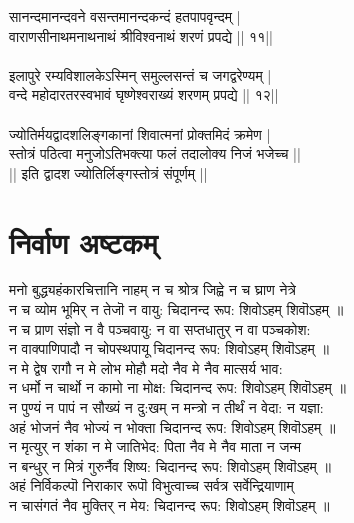 सानन्दमानन्दवने वसन्तमानन्दकन्दं हतपापवृन्दम् |\\
वाराणसीनाथमनाथनाथं श्रीविश्वनाथं शरणं प्रपद्ये || ११||\\
\\
इलापुरे रम्यविशालकेऽस्मिन् समुल्लसन्तं च जगद्वरेण्यम् |\\
वन्दे महोदारतरस्वभावं घृष्णेश्वराख्यं शरणम् प्रपद्ये || १२||\\
\\
ज्योतिर्मयद्वादशलिङ्गकानां शिवात्मनां प्रोक्तमिदं क्रमेण |\\
स्तोत्रं पठित्वा मनुजोऽतिभक्त्या फलं तदालोक्य निजं भजेच्च ||\\
|| इति द्वादश ज्योतिर्लिङ्गस्तोत्रं संपूर्णम् ||\\

\section{\sanskrit निर्वाण अष्टकम् }
\chandas
मनो बुद्ध्यहंकारचित्तानि नाहम् न च श्रोत्र जिह्वे न च घ्राण नेत्रे \\
न च व्योम भूमिर् न तेजॊ न वायु: चिदानन्द रूप: शिवोऽहम् शिवॊऽहम् ॥\\ 
न च प्राण संज्ञो न वै पञ्चवायु: न वा सप्तधातुर् न वा पञ्चकोश: \\
न वाक्पाणिपादौ न चोपस्थपायू चिदानन्द रूप: शिवोऽहम् शिवॊऽहम् ॥ \\
न मे द्वेष रागौ न मे लोभ मोहौ मदो नैव मे नैव मात्सर्य भाव: \\
न धर्मो न चार्थो न कामो ना मोक्ष: चिदानन्द रूप: शिवोऽहम् शिवॊऽहम् ॥\\ 
न पुण्यं न पापं न सौख्यं न दु:खम् न मन्त्रो न तीर्थं न वेदा: न यज्ञा: \\
अहं भोजनं नैव भोज्यं न भोक्ता चिदानन्द रूप: शिवोऽहम् शिवॊऽहम् ॥\\ 
न मृत्युर् न शंका न मे जातिभेद: पिता नैव मे नैव माता न जन्म \\
न बन्धुर् न मित्रं गुरुर्नैव शिष्य: चिदानन्द रूप: शिवोऽहम् शिवॊऽहम् ॥\\ 
अहं निर्विकल्पॊ निराकार रूपॊ विभुत्वाच्च सर्वत्र सर्वेन्द्रियाणाम् \\
न चासंगतं नैव मुक्तिर् न मेय: चिदानन्द रूप: शिवोऽहम् शिवॊऽहम् ॥\\

